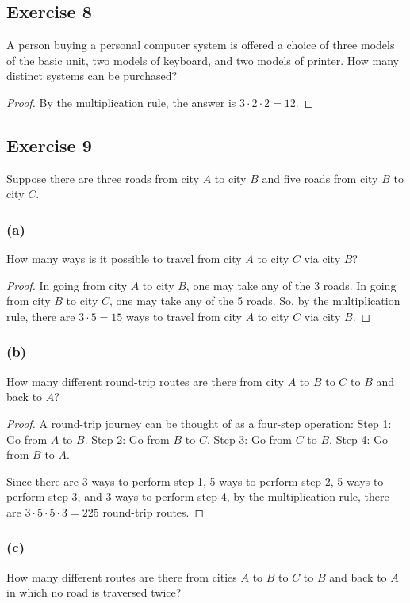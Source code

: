 \documentclass[14pt]{extarticle}
\newcommand{\cy}{\color{cyan}}
\begin{document}
\subsection{Exercise 8}
A person buying a personal computer system is offered a choice of three models of the basic unit, two models of 
keyboard, and two models of printer. How many distinct systems can be purchased?

\begin{proof}
By the multiplication rule, the answer is \(3 \cdot 2 \cdot 2 = 12\).
\end{proof}

\subsection{Exercise 9}
Suppose there are three roads from city $A$ to city $B$ and five roads from city $B$ to city $C$. 

\subsubsection{(a)}
How many ways is it possible to travel from city $A$ to city $C$ via city $B$?

\begin{proof}
In going from city $A$ to city $B$, one may take any of the 3 roads. In going from city $B$ to city $C$, one may take 
any of the 5 roads. So, by the multiplication rule, there are \(3 \cdot 5 = 15\) ways to travel from city $A$ to city 
$C$ via city $B$.
\end{proof}

\subsubsection{(b)}
How many different round-trip routes are there from city $A$ to $B$ to $C$ to $B$ and back to $A$?

\begin{proof}
A round-trip journey can be thought of as a four-step operation: {\cy Step 1:} Go from $A$ to $B$. {\cy Step 2:} 
Go from $B$ to $C$. {\cy Step 3:} Go from $C$ to $B$. {\cy Step 4:} Go from $B$ to $A$.

Since there are 3 ways to perform step 1, 5 ways to perform step 2, 5 ways to perform step 3, and 3 ways to perform 
step 4, by the multiplication rule, there are \(3 \cdot 5 \cdot 5 \cdot 3 = 225\) round-trip routes.
\end{proof}

\subsubsection{(c)}
How many different routes are there from cities $A$ to $B$ to $C$ to $B$ and back to $A$ in which no road is traversed twice?
\end{document}
